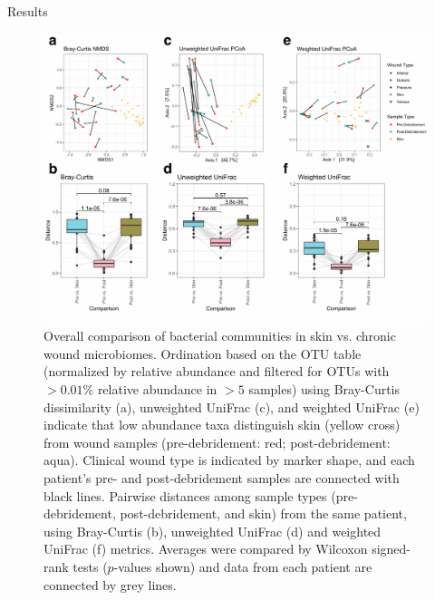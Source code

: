 \documentclass[oneside,12pt,final]{sty/ucthesis-CA2012}
\begin{document}
\begin{mainmatter}
\begin{section}{Results}
\begin{figure}
\centering
\centerline{\includegraphics[width=\textwidth]{fig/C3figS4.pdf}}
\caption{Overall comparison of bacterial communities in skin vs. chronic wound microbiomes. Ordination based on the OTU table (normalized by relative abundance and filtered for OTUs with $>0.01$\% relative abundance in $>5$ samples) using Bray-Curtis dissimilarity (a), unweighted UniFrac (c), and weighted UniFrac (e) indicate that low abundance taxa distinguish skin (yellow cross) from wound samples (pre-debridement: red; post-debridement: aqua). Clinical wound type is indicated by marker shape, and each patient’s pre- and post-debridement samples are connected with black lines. Pairwise distances among sample types (pre-debridement, post-debridement, and skin) from the same patient, using Bray-Curtis (b), unweighted UniFrac (d) and weighted UniFrac (f) metrics. Averages were compared by Wilcoxon signed-rank tests ($p$-values shown) and data from each patient are connected by grey lines.}
\label{fig:S4AF}
\end{figure} 


\end{section}
\end{mainmatter}
\end{document}
